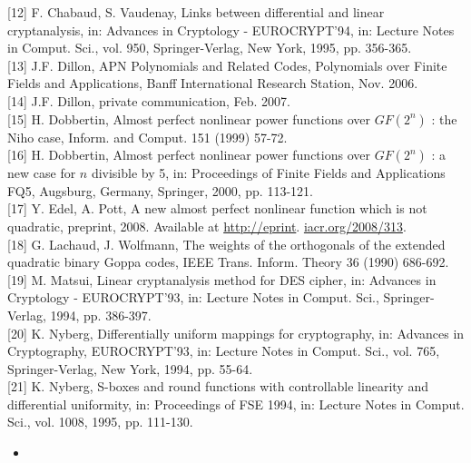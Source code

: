 \documentclass[10pt]{article}
\begin{document}
[12] F. Chabaud, S. Vaudenay, Links between differential and linear cryptanalysis, in: Advances in Cryptology - EUROCRYPT'94, in: Lecture Notes in Comput. Sci., vol. 950, Springer-Verlag, New York, 1995, pp. 356-365.\\[0pt]
[13] J.F. Dillon, APN Polynomials and Related Codes, Polynomials over Finite Fields and Applications, Banff International Research Station, Nov. 2006.\\[0pt]
[14] J.F. Dillon, private communication, Feb. 2007.\\[0pt]
[15] H. Dobbertin, Almost perfect nonlinear power functions over $G F\left(2^{n}\right)$ : the Niho case, Inform. and Comput. 151 (1999) 57-72.\\[0pt]
[16] H. Dobbertin, Almost perfect nonlinear power functions over $G F\left(2^{n}\right)$ : a new case for $n$ divisible by 5, in: Proceedings of Finite Fields and Applications FQ5, Augsburg, Germany, Springer, 2000, pp. 113-121.\\[0pt]
[17] Y. Edel, A. Pott, A new almost perfect nonlinear function which is not quadratic, preprint, 2008. Available at \href{http://eprint}{http://eprint}. \href{http://iacr.org/2008/313}{iacr.org/2008/313}.\\[0pt]
[18] G. Lachaud, J. Wolfmann, The weights of the orthogonals of the extended quadratic binary Goppa codes, IEEE Trans. Inform. Theory 36 (1990) 686-692.\\[0pt]
[19] M. Matsui, Linear cryptanalysis method for DES cipher, in: Advances in Cryptology - EUROCRYPT'93, in: Lecture Notes in Comput. Sci., Springer-Verlag, 1994, pp. 386-397.\\[0pt]
[20] K. Nyberg, Differentially uniform mappings for cryptography, in: Advances in Cryptography, EUROCRYPT'93, in: Lecture Notes in Comput. Sci., vol. 765, Springer-Verlag, New York, 1994, pp. 55-64.\\[0pt]
[21] K. Nyberg, S-boxes and round functions with controllable linearity and differential uniformity, in: Proceedings of FSE 1994, in: Lecture Notes in Comput. Sci., vol. 1008, 1995, pp. 111-130.

\begin{itemize}
  \item 
\end{itemize}
\end{document}
